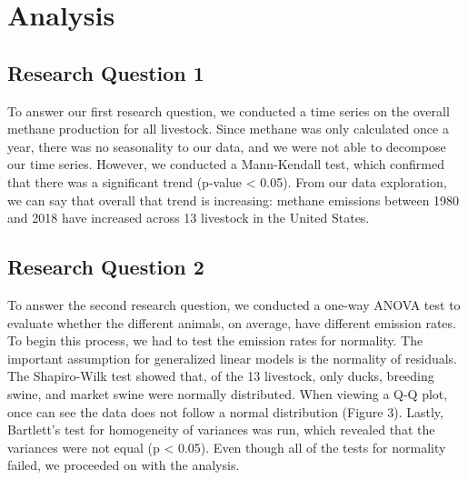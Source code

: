 \documentclass[
  12pt,
]{article}
\begin{document}
\newpage

\hypertarget{analysis}{%
\section{Analysis}\label{analysis}}

\hypertarget{research-question-1}{%
\subsection{Research Question 1}\label{research-question-1}}

To answer our first research question, we conducted a time series on the
overall methane production for all livestock. Since methane was only
calculated once a year, there was no seasonality to our data, and we
were not able to decompose our time series. However, we conducted a
Mann-Kendall test, which confirmed that there was a significant trend
(p-value \textless{} 0.05). From our data exploration, we can say that
overall that trend is increasing: methane emissions between 1980 and
2018 have increased across 13 livestock in the United States.

\hypertarget{research-question-2}{%
\subsection{Research Question 2}\label{research-question-2}}

To answer the second research question, we conducted a one-way ANOVA
test to evaluate whether the different animals, on average, have
different emission rates. To begin this process, we had to test the
emission rates for normality. The important assumption for generalized
linear models is the normality of residuals. The Shapiro-Wilk test
showed that, of the 13 livestock, only ducks, breeding swine, and market
swine were normally distributed. When viewing a Q-Q plot, once can see
the data does not follow a normal distribution (Figure 3). Lastly,
Bartlett's test for homogeneity of variances was run, which revealed
that the variances were not equal (p \textless{} 0.05). Even though all
of the tests for normality failed, we proceeded on with the analysis.
\end{document}
